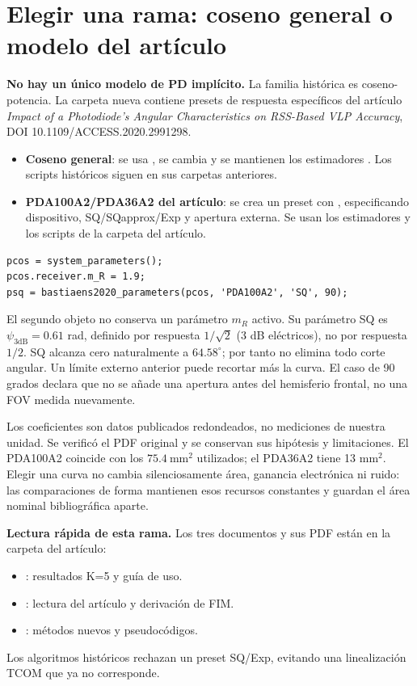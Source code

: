 \documentclass[11pt,a4paper]{article}
\begin{document}
\section{Elegir una rama: coseno general o modelo del artículo}
\textbf{No hay un único modelo de PD implícito.} La familia histórica es coseno-potencia. La carpeta nueva  contiene presets de respuesta específicos del artículo \emph{Impact of a Photodiode's Angular Characteristics on RSS-Based VLP Accuracy}, DOI 10.1109/ACCESS.2020.2991298.
\begin{itemize}
\item \textbf{Coseno general}: se usa , se cambia  y se mantienen los estimadores . Los scripts históricos siguen en sus carpetas anteriores.
\item \textbf{PDA100A2/PDA36A2 del artículo}: se crea un preset con , especificando dispositivo, SQ/SQapprox/Exp y apertura externa. Se usan los estimadores  y los scripts de la carpeta del artículo.
\end{itemize}
\begin{verbatim}
pcos = system_parameters();
pcos.receiver.m_R = 1.9;
psq = bastiaens2020_parameters(pcos, 'PDA100A2', 'SQ', 90);
\end{verbatim}
El segundo objeto no conserva un parámetro $m_R$ activo. Su parámetro SQ es $\psi_{3\mathrm{dB}}=0.61$ rad, definido por respuesta $1/\sqrt2$ (3 dB eléctricos), no por respuesta $1/2$. SQ alcanza cero naturalmente a $64.58^\circ$; por tanto no elimina todo corte angular. Un límite externo anterior puede recortar más la curva. El caso de 90 grados declara que no se añade una apertura antes del hemisferio frontal, no una FOV medida nuevamente.

Los coeficientes son datos publicados redondeados, no mediciones de nuestra unidad. Se verificó el PDF original y se conservan sus hipótesis y limitaciones. El PDA100A2 coincide con los $75.4\ \mathrm{mm}^2$ utilizados; el PDA36A2 tiene 13 mm$^2$. Elegir una curva no cambia silenciosamente área, ganancia electrónica ni ruido: las comparaciones de forma mantienen esos recursos constantes y guardan el área nominal bibliográfica aparte.

\textbf{Lectura rápida de esta rama.} Los tres documentos y sus PDF están en la carpeta del artículo:
\begin{itemize}
\item {}: resultados K=5 y guía de uso.
\item {}: lectura del artículo y derivación de FIM.
\item {}: métodos nuevos y pseudocódigos.
\end{itemize}
Los algoritmos históricos rechazan un preset SQ/Exp, evitando una linealización TCOM que ya no corresponde.
\end{document}
